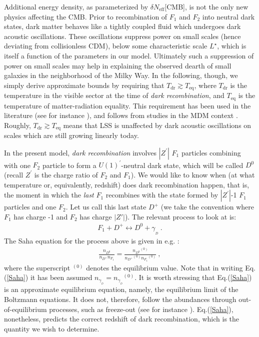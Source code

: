 \documentclass[12pt]{article}
\begin{document}
Additional energy density, as parameterized by $\delta N
_{\text{eff}}$[CMB], is not the only new physics affecting the CMB.
Prior to recombination of $F _1$ and $F _2$ into neutral dark states,
dark matter behaves like a tightly coupled fluid which undergoes dark
acoustic oscillations. These oscillations suppress power on small scales
(hence deviating from collisionless CDM), below some characteristic
scale $L ^{\star}$, which is itself a function of the parameters in our
model. Ultimately such a suppression of power on small scales may help
in explaining the observed dearth of small galaxies in the neighborhood
of the Milky Way. In the following, though, we simply derive approximate
bounds by requiring that $T _{\text{dr}} \gtrsim T _{\text{eq}}$, where
$T _{\text{dr}}$ is the temperature in the visible sector at the time of
\textit{dark recombination}, and $T _{\text{eq}}$ is the temperature of
matter-radiation equality. This requirement has been used in the
literature (see for instance \cite{volkaspetraki}), and follows from
studies in the MDM context \cite{berezhiani,implications,cia}. Roughly,
$T _{\text{dr}} \gtrsim T _{\text{eq}}$ means that LSS is unaffected by
dark acoustic oscillations on scales which are still growing linearly
today.

In the present model, \textit{dark recombination} involves $|Z ^{'}|$ $F
_1$ particles combining with one $F _2$ particle to form a $U(1)
^{'}$-neutral dark state, which will be called $D ^0$ (recall $Z ^{'}$
is the charge ratio of $F _2$ and $F _1$). We would like to know when
(at what temperature or, equivalently, redshift) does dark recombination
happen, that is, the moment in which the \textit{last} $F _1$ recombines
with the state formed by $|Z ^{'}|$-1 $F _1$ particles and one $F _2$.
Let us call this last state $D ^+$ (we take the convention where $F _1$
has charge -1 and $F _2$ has charge $|Z'|$). The relevant process to
look at is:
%
\begin{eqnarray}
F _1 + D ^+ \leftrightarrow D ^0 + \gamma _{_D} \ .
\end{eqnarray}
%
The Saha equation for the process above is given in e.g.
\cite{dodelson}:
%
\begin{eqnarray}
\frac{n _{D ^0}}{n _{D ^+} n _{F_1}} = \frac{{n _{D ^0}}^{(0)}}{{n_{D
^+}}^{(0)}{n _{F_1}}^{(0)}} \ ,
\label{Saha}
\end{eqnarray}
%
where the superscript $^{(0)}$ denotes the equilibrium value. Note that
in writing Eq.(\ref{Saha}) it has been assumed $n _{\gamma _{_D}} = {n
_{\gamma _{_D}}} ^{(0)}$. It is worth stressing that Eq.(\ref{Saha}) is
an approximate equilibrium equation, namely, the equilibrium limit of
the Boltzmann equations. It does not, therefore, follow the abundances
through out-of-equilibrium processes, such as freeze-out (see for
instance \cite{dodelson}). Eq.(\ref{Saha}), nonetheless, predicts the
correct redshift of dark recombination, which is the quantity we wish to
determine.
\end{document}
